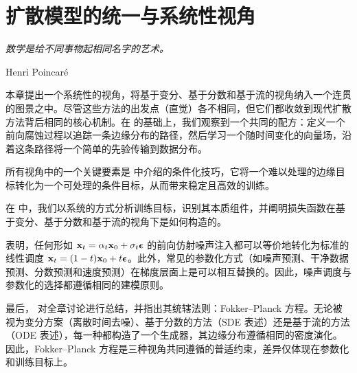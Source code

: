 \chapter{扩散模型的统一与系统性视角}\label{ch:all-equivalent} 

\epigraph{
    \textit{数学是给不同事物起相同名字的艺术。
}}{Henri Poincaré}

本章提出一个系统性的视角，将基于变分、基于分数和基于流的视角纳入一个连贯的图景之中。尽管这些方法的出发点（直觉）各不相同，但它们都收敛到现代扩散方法背后相同的核心机制。在  的基础上，我们观察到一个共同的配方：定义一个前向腐蚀过程以追踪一条边缘分布的路径，然后学习一个随时间变化的向量场，沿着这条路径将一个简单的先验传输到数据分布。

所有视角中的一个关键要素是  中介绍的条件化技巧，它将一个难以处理的边缘目标转化为一个可处理的条件目标，从而带来稳定且高效的训练。

在  中，我们以系统的方式分析训练目标，识别其本质组件，并阐明损失函数在基于变分、基于分数和基于流的视角下是如何构造的。


 表明，任何形如 ${\mathbf{x}}_t = \alpha_t {\mathbf{x}}_0 + \sigma_t {\bm{\epsilon}}$ 的前向仿射噪声注入都可以等价地转化为标准的线性调度 ${\mathbf{x}}_t = (1 - t){\mathbf{x}}_0 + t{\bm{\epsilon}}$。此外，常见的参数化方式（如噪声预测、干净数据预测、分数预测和速度预测）在梯度层面上是可以相互替换的。因此，噪声调度与参数化的选择都遵循相同的建模原则。



最后， 对全章讨论进行总结，并指出其统辖法则：Fokker–Planck 方程。无论被视为变分方案（离散时间去噪）、基于分数的方法（SDE 表述）还是基于流的方法（ODE 表述），每一种都构造了一个生成器，其边缘分布遵循相同的密度演化。因此，Fokker–Planck 方程是三种视角共同遵循的普适约束，差异仅体现在参数化和训练目标上。



\newpage

